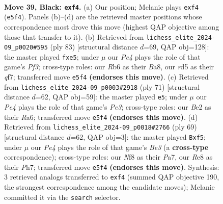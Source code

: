 \documentclass[11pt]{article}
\begin{document}
\clearpage

\begin{figure}[p]\centering
\begin{subfigure}{0.46\textwidth}\centering
\resizebox{\linewidth}{!}{%
\newchessgame
\chessboard[
  setfen={k3rn2/1p6/1r1p4/3Rp1Q1/4PP2/1PR5/K3b1PP/8 b - - 0 39},
  showmover=false,
  pgfstyle=straightmove, color=movearrow, markmove={e5-f4}
]}
\caption{}
\end{subfigure}\hfill
\begin{subfigure}{0.46\textwidth}\centering
\resizebox{\linewidth}{!}{%
\newchessgame
\chessboard[
  setfen={b1kr4/5Q2/r2p1p2/2pPPP2/p1N3P1/2P5/P6P/1R4K1 b - - 0 42},
  showmover=false,
  pgfstyle=straightmove, color=movearrow, markmove={f6-e5}
]}
\caption{}
\end{subfigure}
\\[4pt]
\begin{subfigure}{0.46\textwidth}\centering
\resizebox{\linewidth}{!}{%
\newchessgame
\chessboard[
  setfen={8/p7/r3pk1p/6p1/p3R2P/P1r2P2/R5PK/8 b - - 2 36},
  showmover=false,
  pgfstyle=straightmove, color=movearrow, markmove={e6-e5}
]}
\caption{}
\end{subfigure}\hfill
\begin{subfigure}{0.46\textwidth}\centering
\resizebox{\linewidth}{!}{%
\newchessgame
\chessboard[
  setfen={8/p5rp/1pr1b3/5R1k/4pQ1P/P7/1P3PPK/8 b - - 0 35},
  showmover=false,
  pgfstyle=straightmove, color=movearrow, markmove={e6-f5}
]}
\caption{}
\end{subfigure}
\caption{\textbf{Move 39, Black: \texttt{exf4}.} (a) Our position; Melanie plays \texttt{exf4} (\texttt{e5f4}). Panels (b)--(d) are the retrieved master positions whose correspondence most drove this move (highest QAP objective among those that transfer to it). (b) Retrieved from \texttt{lichess\_elite\_2024-09\_p0020\#595} (ply 83) [structural distance $d$=69, QAP obj=128]: the master played \texttt{fxe5}; under $\mu$ our \emph{Pe4} plays the role of that game's \emph{Pf3}; cross-type roles: our \emph{R}b6 as their \emph{B}a8, our \emph{r}d5 as their \emph{q}f7; transferred move \texttt{e5f4} \textbf{(endorses this move)}. (c) Retrieved from \texttt{lichess\_elite\_2024-09\_p0003\#2918} (ply 71) [structural distance $d$=62, QAP obj=59]: the master played \texttt{e5}; under $\mu$ our \emph{Pe4} plays the role of that game's \emph{Pe3}; cross-type roles: our \emph{B}e2 as their \emph{R}a6; transferred move \texttt{e5f4} \textbf{(endorses this move)}. (d) Retrieved from \texttt{lichess\_elite\_2024-09\_p0018\#2766} (ply 69) [structural distance $d$=62, QAP obj=3]: the master played \texttt{Bxf5}; under $\mu$ our \emph{Pe4} plays the role of that game's \emph{Be3} (a \textbf{cross-type} correspondence); cross-type roles: our \emph{N}f8 as their \emph{P}a7, our \emph{R}e8 as their \emph{P}h7; transferred move \texttt{e5f4} \textbf{(endorses this move)}. Synthesis: 3 retrieved analogs transferred to \texttt{exf4} (summed QAP objective 190, the strongest correspondence among the candidate moves); Melanie committed it via the \texttt{search} selector.}
\label{fig:thought-m77}
\end{figure}
\end{document}
